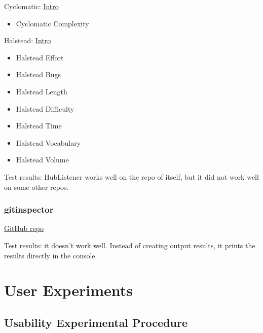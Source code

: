 \documentclass[letterpaper,cleveref]{lipics-v2019}
\theoremstyle{definition}
\begin{document}
Cyclomatic:
\href{https://www.geeksforgeeks.org/cyclomatic-complexity/}{Intro}
\begin{itemize}
\item Cyclomatic Complexity
\end{itemize}
 
Halstead:
\href{https://www.geeksforgeeks.org/software-engineering-halsteads-software-metrics/}{Intro}
\begin{itemize}
\item Halstead Effort
\item Halstead Bugs
\item Halstead Length
\item Halstead Difficulty
\item Halstead Time
\item Halstead Vocabulary
\item Halstead Volume
\end{itemize}

Test results: HubListener works well on the repo of itself, but it did not work
well on some other repos.

\subsubsection{gitinspector}
\href{https://github.com/ejwa/gitinspector}{GitHub repo}

Test results: it doesn't work well. Instead of creating output results, it
prints the results directly in the console.

\section{User Experiments}
\subsection{Usability Experimental Procedure}
\end{document}
